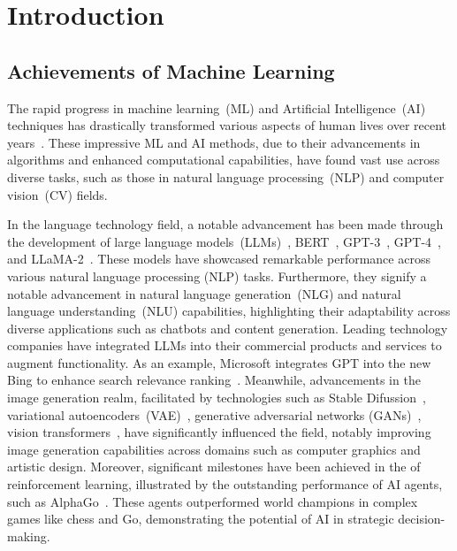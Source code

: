 \chapter{Introduction}\label{chap:intro}

\section{Achievements of Machine Learning} \label{sec:achiml}

The rapid progress in machine learning~(ML) and Artificial Intelligence~(AI) techniques
has drastically transformed various aspects of human lives over recent years~\cite{bengio-nature15,taward18}.
%
These impressive ML and AI methods, due to their advancements in algorithms
and enhanced computational capabilities,
have found vast use across
diverse tasks, such as those in natural language processing~(NLP) and computer vision~(CV) fields.



In the language technology field, a notable advancement has been made through the development
of large language models~(LLMs)~\cite{llm-tist23,gptedu-lid23,transformer-17}, BERT~\cite{dclt-bert19}, GPT-3~\cite{gpt-3-neurips20}, GPT-4~\cite{gpt-4-corr23}, and LLaMA-2~\cite{llama-2-corr23}.
%
These models have showcased remarkable performance across various natural language processing (NLP) tasks.
%
Furthermore, they signify a notable advancement in natural language generation~(NLG) 
and natural language understanding~(NLU) capabilities, 
highlighting their adaptability across diverse applications such as chatbots and content generation.
%
Leading technology companies have integrated LLMs into their commercial products 
and services to augment functionality.
%
As an example, Microsoft integrates GPT into the new Bing to enhance search relevance ranking~\cite{bing-17}.
%
Meanwhile, advancements in the image generation realm, facilitated by technologies 
such as Stable Difussion~\cite{rbleo-cvpr22}, variational autoencoders~(VAE)~\cite{kw-corr13}, generative adversarial networks (GANs)~\cite{gan-corr14},
vision transformers~\cite{vtransformer-21}, have significantly influenced the field,
notably improving image generation capabilities across domains such as computer graphics and artistic design.
%
Moreover, significant milestones have been achieved in the  of reinforcement learning, 
illustrated by the outstanding performance of AI agents, such as AlphaGo~\cite{rl-nature15,rlchess-science18,rlgo-nature17}.
%
These agents outperformed world champions in complex games like chess and Go,
demonstrating the potential of AI in strategic decision-making.

